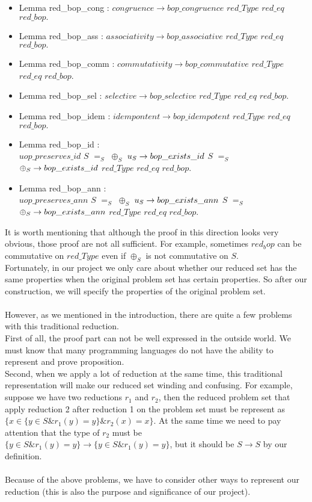 \documentclass[a4paper,12pt,twoside,openright]{report}
\begin{document}
\begin{itemize}
\item Lemma red\_bop\_cong : $congruence \rightarrow bop\_congruence$ $red\_Type$ $red\_eq$ $red\_bop.$ 
\item Lemma red\_bop\_ass : $associativity \rightarrow bop\_associative$ $red\_Type$ $red\_eq$ $red\_bop.$ 
\item Lemma red\_bop\_comm : $commutativity \rightarrow bop\_commutative$ $red\_Type$ $red\_eq$ $red\_bop.$
\item Lemma red\_bop\_sel : $selective \rightarrow bop\_selective$ $red\_Type$ $red\_eq$ $red\_bop.$ 
\item Lemma red\_bop\_idem : $idempontent \rightarrow bop\_idempotent$ $red\_Type$ $red\_eq$ $red\_bop.$  
\item Lemma red\_bop\_id : \\$uop\_preserves\_id$ $S$ $=_S$ $\oplus_S$ $u_S \rightarrow\\ bop\_exists\_id$ $S$ $=_S$ $\oplus_S \rightarrow\\ bop\_exists\_id$ $red\_Type$ $red\_eq$ $red\_bop.$ 
\item Lemma red\_bop\_ann : \\$uop\_preserves\_ann$ $S$ $=_S$ $\oplus_S$ $u_S \rightarrow\\ bop\_exists\_ann$ $S$ $=_S$ $\oplus_S \rightarrow\\ bop\_exists\_ann$ $red\_Type$ $red\_eq$ $red\_bop.$ 
\end{itemize}
It is worth mentioning that although the proof in this direction looks very obvious, those proof are not all sufficient. For example, sometimes $red_bop$ can be commutative on $red\_Type$ even if $\oplus_S$ is not commutative on $S$.\\
Fortunately, in our project we only care about whether our reduced set has the same properties when the original problem set has certain properties. So after our construction, we will specify the properties of the original problem set.\\\\
However, as we mentioned in the introduction, there are quite a few problems with this traditional reduction.\\
First of all, the proof part can not be well expressed in the outside world. We must know that many programming languages do not have the ability to represent and prove proposition.\\
Second, when we apply a lot of reduction at the same time, this traditional representation will make our reduced set winding and confusing. For example, suppose we have two reductions $r_1$ and $r_2$, then the reduced problem set that apply reduction 2 after reduction 1 on the problem set must be represent as $\{x \in \{ y \in S \& r_1 (y) = y\} \& r_2 (x) = x\}$. At the same time we need to pay attention that the type of $r_2$ must be $\{ y \in S \& r_1 (y) = y\} \rightarrow \{ y \in S \& r_1 (y) = y\}$, but it should be $S \rightarrow S$ by our definition.\\\\
Because of the above problems, we have to consider other ways to represent our reduction (this is also the purpose and significance of our project).
\end{document}
